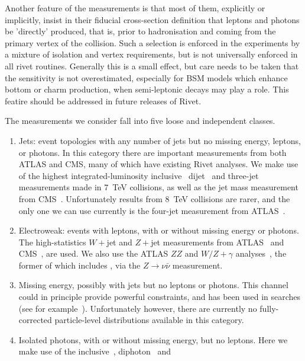 \documentclass[floatfix]{article}
\begin{document}
Another feature of the measurements is that most of them, explicitly or implicitly, insist in their fiducial cross-section definition 
that leptons and photons be 'directly' produced, that is, prior to hadronisation and coming from the primary vertex of the collision. 
Such a selection is enforced in the experiments by a mixture of isolation and vertex requirements, but is not universally enforced
in all rivet routines. Generally this is a small effect, but care needs to be taken that the sensitivity is not overestimated, especially
for BSM models which enhance bottom or charm production, when semi-leptonic decays may play a role.
This featire should be addressed in future releases of Rivet.

The measurements we consider fall into five loose and independent classes.
\begin{enumerate}
\item
Jets: event topologies with any number of jets but no missing energy, leptons, or photons. In this category there
are important measurements from both ATLAS and CMS, many of which have existing Rivet analyses. We make use of 
the highest integrated-luminosity inclusive~\cite{Aad:2014vwa,Chatrchyan:2014gia} dijet~\cite{Aad:2013tea,Aad:2014pua} 
and three-jet~\cite{Aad:2014rma} %
measurements made in 7~TeV collisions, as well as the jet mass 
measurement from CMS~\cite{Chatrchyan:2013vbb}.
Unfortunately results from 8~TeV collisions are rarer, and the only one we can use currently is the four-jet 
measurement from ATLAS~\cite{Aad:2015nda}.
\item
Electroweak: events with leptons, with or without missing energy or photons. The high-statistics $W+$jet and $Z+$jet measurements from ATLAS~\cite{Aad:2014qxa,Aad:2013ysa} 
and CMS~\cite{Khachatryan:2014uva}, are used.
We also use the ATLAS $ZZ$ and $W/Z+\gamma$ analyses~\cite{Aad:2012awa,Aad:2013izg}, the former of which includes \MET, 
via the $Z \rightarrow \nu\bar{\nu}$ measurement.
\item
Missing energy, possibly with jets but no leptons or photons. This channel could in principle provide powerful constraints, and has been used in searches (see for example~\cite{Aad:2012fqa}). Unfortunately however, there are currently no fully-corrected particle-level distributions available in this category. 
\item
Isolated photons, with or without missing energy, but no leptons. Here we make use of the inclusive~\cite{Aad:2013zba}, diphoton~\cite{Aad:2012tba} and 

\end{enumerate}
\end{document}
